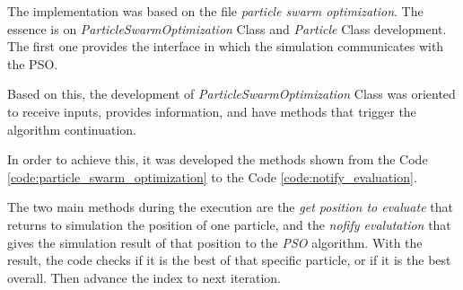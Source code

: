 The implementation was based on the file \textit{particle swarm optimization}. The essence is on \textit{ParticleSwarmOptimization} Class and \textit{Particle} Class development. The first one provides the interface in which the simulation communicates with the PSO.

Based on this, the development of \textit{ParticleSwarmOptimization} Class was oriented to receive inputs, provides information, and have methods that trigger the algorithm continuation.

In order to achieve this, it was developed the methods shown from the Code \ref{code:particle_swarm_optimization} to the Code \ref{code:notify_evaluation}.













The two main methods during the execution are the \textit{get position to evaluate} that returns to simulation the position of one particle, and the \textit{nofify evalutation} that gives the simulation result of that position to the \textit{PSO} algorithm. With the result, the code checks if it is the best of that specific particle, or if it is the best overall. Then advance the index to next iteration.

